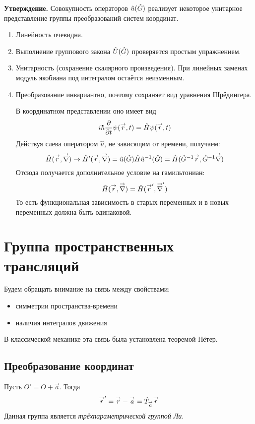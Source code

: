 \textbf{Утверждение.} Совокупность операторов $\Hat u(\Hat G)$ реализует некоторое унитарное представление группы преобразований систем координат. 
\begin{enumerate}
  \item Линейность очевидна.
  \item Выполнение группового закона $\Hat U(\hat G)$ проверяется простым упражнением.
  \item Унитарность (сохранение скалярного произведения). При линейных заменах модуль якобиана под интегралом остаётся неизменным.
  \item Преобразование инвариантно, поэтому сохраняет вид уравнения Шрёдингера.
  
  В координатном представлении оно имеет вид
  $$
    i \hbar \ud{}{t} \psi(\vec r, t) = \hat H \psi(\vec r, t)
  $$
  Действуя слева оператором $\hat u$, не зависящим от времени, получаем:
  $$
    \hat H(\vec r, \vec \nla) \to \Hat H' (\vec r, \vec \nla) = \hat u(\hat G) \Hat H \hat u^{-1} (\hat G) = 
    {\Hat H}({\Hat G}^{-1} \vec{r}, {\Hat G}^{-1} \vec{\nabla})
  $$
  Отсюда получается дополнительное условие на гамильтониан:
  $$
    \Hat H(\vec r, \vec \nla) = \hat H(\vec r', \vec \nla')
  $$
  То есть функциональная зависимость в старых переменных и в новых переменных должна быть одинаковой.
\end{enumerate}

\section{Группа пространственных трансляций}
Будем обращать внимание на связь между свойствами:
\begin{itemize}
  \item симметрии пространства-времени
  \item наличия интегралов движения
\end{itemize}
В классической механике эта связь была установлена теоремой Нётер.

\subsection{Преобразование координат}

Пусть $O' = O + \vec a$. Тогда
$$
    \vec r' = \vec r - \vec a = \Hat T_{\vec a} \vec r
$$
Данная группа является \emph{трёхпараметрической группой Ли}.

